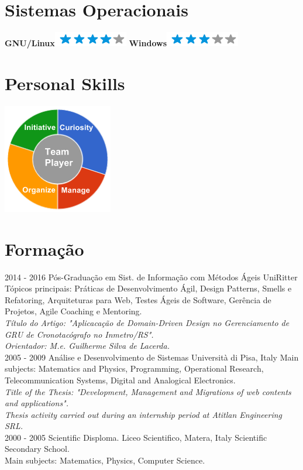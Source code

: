 \documentclass[]{friggeri-cv}
\begin{document}
\begin{aside}
  \section{Sistemas Operacionais}
    \textbf{GNU/Linux}\includegraphics[scale=0.40]{img/4stars.png}
    \textbf{Windows}\includegraphics[scale=0.40]{img/3stars.png}
    ~
  \section{Personal Skills}
    \includegraphics[scale=0.62]{img/personal.png}
    ~
\end{aside}

\section{Formação}
\begin{entrylist}
  \entry
    {2014 - 2016}
    {Pós-Graduação em Sist. de Informação com Métodos Ágeis}
    {UniRitter}
    {Tópicos principais: Práticas de Desenvolvimento Ágil, Design Patterns, Smells e Refatoring, Arquiteturas para Web, Testes Ágeis de Software, Gerência de Projetos, Agile Coaching e Mentoring.\\
    \emph{Título do Artigo: "Aplicacação de Domain-Driven Design no Gerenciamento de
GRU de Cronotacógrafo no Inmetro/RS".}\\
    \emph{Orientador: M.e. Guilherme Silva de Lacerda.}\\}
  \entry
    {2005 - 2009}
    {Análise e Desenvolvimento de Sistemas}
    {Università di Pisa, Italy}
    {Main subjects: Matematics and Physics, Programming, Operational Research, Telecommunication Systems, Digital and Analogical Electronics.\\
    \emph{Title of the Thesis: "Development, Management and Migrations of web contents and applications".}\\
    \emph{Thesis activity carried out during an internship period at Atitlan Engineering SRL.}\\}
  \entry
    {2000 - 2005}
    {Scientific Disploma.}
    {Liceo Scientifico, Matera, Italy}
    {Scientific Secondary School.\\
    Main subjects: Matematics, Physics, Computer Science.}
\end{entrylist}
\end{document}
